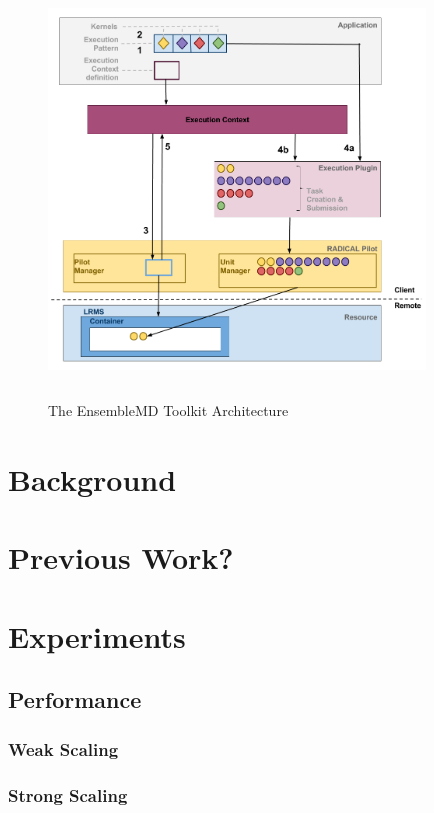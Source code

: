 \documentclass[conference]{IEEEtran}
\begin{document}
\begin{figure}[h]
\caption{The EnsembleMD Toolkit Architecture}
\centering
\includegraphics[width=10cm,height=11cm]{enmdtk_arch}
\end{figure}



 

\section{Background}

\section{Previous Work?}

\section{Experiments}


\subsection{Performance}

\subsubsection{Weak Scaling}
\subsubsection{Strong Scaling}
\end{document}

